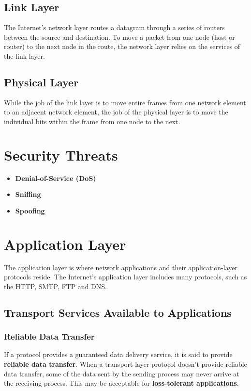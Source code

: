 \documentclass[11pt]{article}
\begin{document}
\subsection{Link Layer}

The Internet’s network layer routes a datagram through a series of routers between the source and destination. To move a packet from one node (host or router) to the next node in the route, the network layer relies on the services of the link layer.

\subsection{Physical Layer}

While the job of the link layer is to move entire frames from one network element to an adjacent network element, the job of the physical layer is to move the individual bits within the frame from one node to the next.

\section{Security Threats}

\begin{itemize}
	\item \textbf{Denial-of-Service (DoS)}
	\item \textbf{Sniffing}
	\item \textbf{Spoofing}
\end{itemize}

\section{Application Layer}

The application layer is where network applications and their application-layer protocols reside. The Internet's application layer includes many protocols, such as the HTTP, SMTP, FTP and DNS.

\subsection{Transport Services Available to Applications}

\subsubsection{Reliable Data Transfer}

If a protocol provides a guaranteed data delivery service, it is said to provide \textbf{reliable data transfer}. When a transport-layer protocol doesn’t provide reliable data transfer, some of the data sent by the sending process may never arrive at the receiving process. This may be acceptable for \textbf{loss-tolerant applications}.
\end{document}
